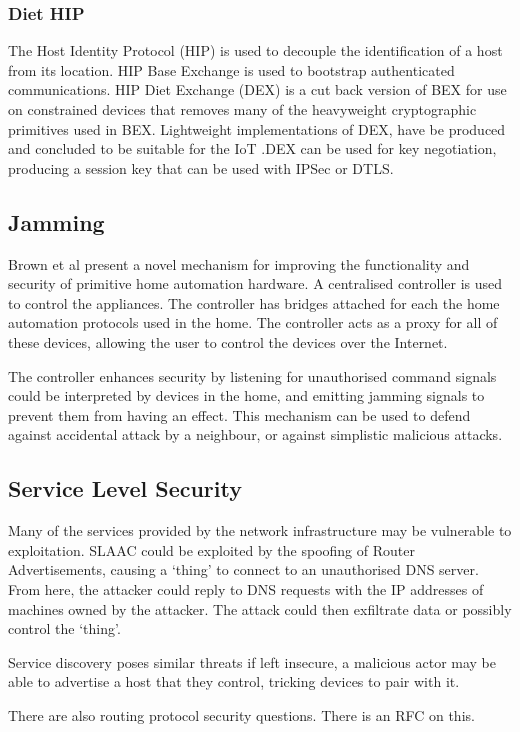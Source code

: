 \documentclass[10pt,journal,compsoc]{IEEEtran}
\begin{document}
\subsubsection{Diet HIP}
The Host Identity Protocol (HIP) is used to decouple the identification of a
host from its location. HIP Base Exchange is used to bootstrap authenticated
communications. HIP Diet Exchange (DEX) is a cut back version of BEX for use on
constrained devices that removes many of the heavyweight cryptographic
primitives used in BEX.  Lightweight implementations of DEX, have be produced
and concluded to be suitable for the IoT \cite{Meca2013}.DEX can be used for
key negotiation, producing a session key that can be used with IPSec or DTLS. 

\subsection{Jamming}
Brown et al \cite{Brown2013} present a novel mechanism for improving the
functionality and security of primitive home automation hardware. A centralised
controller is used to control the appliances. The controller has bridges
attached for each the home automation protocols used in the home. The
controller acts as a proxy for all of these devices, allowing the user to
control the devices over the Internet. 

The controller enhances security by listening for unauthorised command signals
could be interpreted by devices in the home, and emitting jamming signals to
prevent them from having an effect. This mechanism can be used to defend
against accidental attack by a neighbour, or against simplistic malicious
attacks. 

\subsection{Service Level Security}
Many of the services provided by the network infrastructure may be vulnerable
to exploitation. SLAAC could be exploited by the spoofing of Router
Advertisements, causing a `thing' to connect to an unauthorised DNS server.
From here, the attacker could reply to DNS requests with the IP addresses of
machines owned by the attacker. The attack could then exfiltrate data or
possibly control the `thing'.

Service discovery poses similar threats if left insecure, a malicious actor may
be able to advertise a host that they control, tricking devices to pair with
it.

There are also routing protocol security questions. There is an RFC on this.  
\end{document}
